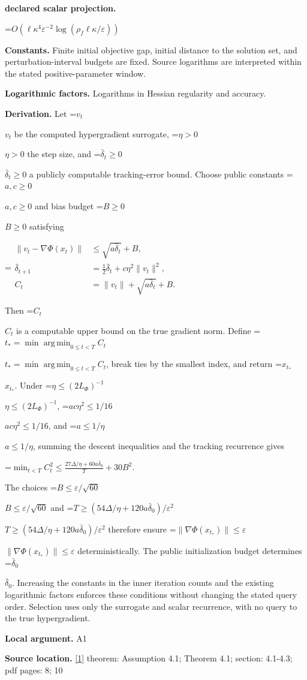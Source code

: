 \documentclass[10pt,a4paper]{article}
\newcommand{\AtlasMath}[1]{\par\begingroup\centering\setbox0=\hbox{$\displaystyle #1$}\ifdim\wd0>1.4\linewidth\typeout{ATLAS WIDE FORMULA: \the\wd0}\fi\ifdim\wd0>\linewidth\resizebox{\linewidth}{!}{\box0}\else\box0\fi\par\endgroup}
\newcommand{\AtlasInlineMath}[1]{\begingroup\setbox0=\hbox{$#1$}\ifdim\wd0>.4\linewidth\endgroup\AtlasMath{#1}\else\endgroup$#1$\fi}
\begin{document}
\textbf{declared scalar projection.}

\AtlasMath{O(\ell  \kappa ^4 \varepsilon ^{-2} \log(\rho _f \ell \kappa /\varepsilon ))}
\textbf{Constants.} Finite initial objective gap, initial distance to the solution set, and perturbation-interval budgets are fixed. Source logarithms are interpreted within the stated positive-parameter window.

\textbf{Logarithmic factors.} Logarithms in Hessian regularity and accuracy.

\textbf{Derivation.} Let \AtlasInlineMath{v_t} be the computed hypergradient surrogate, \AtlasInlineMath{\eta>0} the step size, and \AtlasInlineMath{\bar\delta_t\ge0} a publicly computable tracking-error bound. Choose public constants \AtlasInlineMath{a,c\ge0} and bias budget \AtlasInlineMath{B\ge0} satisfying

\AtlasMath{\begin{aligned}
\|v_t-\nabla\Phi(x_t)\|&\le\sqrt{a\bar\delta_t}+B,\\
\bar\delta_{t+1}&=\tfrac12\bar\delta_t+c\eta^2\|v_t\|^2,\\
C_t&=\|v_t\|+\sqrt{a\bar\delta_t}+B.
\end{aligned}}

Then \AtlasInlineMath{C_t} is a computable upper bound on the true gradient norm. Define \AtlasInlineMath{t_* = \min\operatorname*{arg\,min}_{0\le t<T} C_t}, break ties by the smallest index, and return \AtlasInlineMath{x_{t_*}}. Under \AtlasInlineMath{\eta\le(2L_\Phi)^{-1}}, \AtlasInlineMath{ac\eta^2\le1/16}, and \AtlasInlineMath{a\le1/\eta}, summing the descent inequalities and the tracking recurrence gives

\AtlasMath{\min_{t<T}C_t^2\le\frac{27\Delta/\eta+60a\bar\delta_0}{T}+30B^2.}

The choices \AtlasInlineMath{B\le\varepsilon/\sqrt{60}} and \AtlasInlineMath{T\ge(54\Delta/\eta+120a\bar\delta_0)/\varepsilon^2} therefore ensure \AtlasInlineMath{\|\nabla\Phi(x_{t_*})\|\le\varepsilon} deterministically. The public initialization budget determines \AtlasInlineMath{\bar\delta_0}. Increasing the constants in the inner iteration counts and the existing logarithmic factors enforces these conditions without changing the stated query order. Selection uses only the surrogate and scalar recurrence, with no query to the true hypergradient.

\textbf{Local argument.} A1

\textbf{Source location.} \href{https://proceedings.mlr.press/v247/chen24a/chen24a.pdf}{[1]} theorem: Assumption 4.1; Theorem 4.1; section: 4.1-4.3; pdf pages: 8; 10
\end{document}
